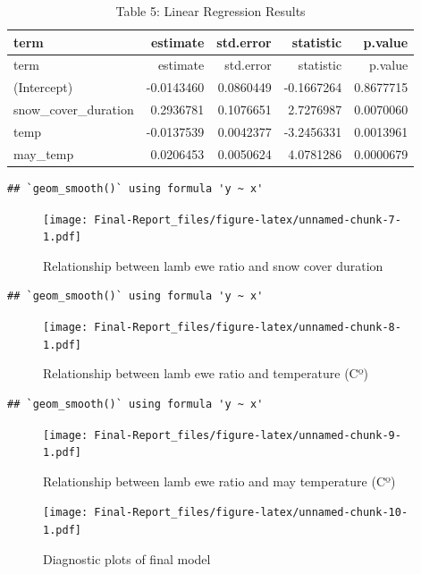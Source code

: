 \documentclass[
  12pt,
]{article}
\begin{document}
\begin{longtable}[]{@{}lrrrr@{}}
\caption{Table 5: Linear Regression Results}\tabularnewline
\toprule
term & estimate & std.error & statistic & p.value \\
\midrule
\endfirsthead
\toprule
term & estimate & std.error & statistic & p.value \\
\midrule
\endhead
(Intercept) & -0.0143460 & 0.0860449 & -0.1667264 & 0.8677715 \\
snow\_cover\_duration & 0.2936781 & 0.1076651 & 2.7276987 & 0.0070060 \\
temp & -0.0137539 & 0.0042377 & -3.2456331 & 0.0013961 \\
may\_temp & 0.0206453 & 0.0050624 & 4.0781286 & 0.0000679 \\
\bottomrule
\end{longtable}

\begin{verbatim}
## `geom_smooth()` using formula 'y ~ x'
\end{verbatim}

\begin{figure}
\centering
\texttt{[image: Final-Report\_files/figure-latex/unnamed-chunk-7-1.pdf]}
\caption{Relationship between lamb ewe ratio and snow cover duration}
\end{figure}

\begin{verbatim}
## `geom_smooth()` using formula 'y ~ x'
\end{verbatim}

\begin{figure}
\centering
\texttt{[image: Final-Report\_files/figure-latex/unnamed-chunk-8-1.pdf]}
\caption{Relationship between lamb ewe ratio and temperature (Cº)}
\end{figure}

\begin{verbatim}
## `geom_smooth()` using formula 'y ~ x'
\end{verbatim}

\begin{figure}
\centering
\texttt{[image: Final-Report\_files/figure-latex/unnamed-chunk-9-1.pdf]}
\caption{Relationship between lamb ewe ratio and may temperature (Cº)}
\end{figure}

\begin{figure}
\centering
\texttt{[image: Final-Report\_files/figure-latex/unnamed-chunk-10-1.pdf]}
\caption{Diagnostic plots of final model}
\end{figure}
\end{document}
